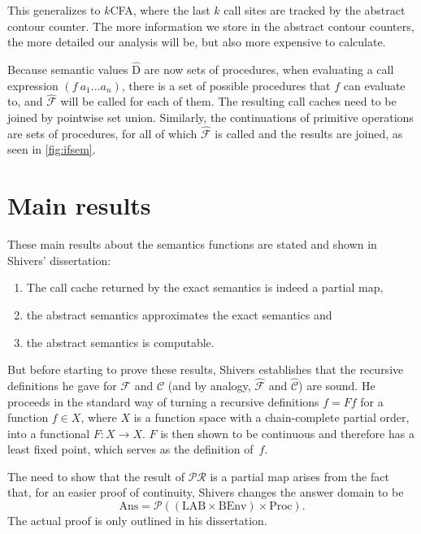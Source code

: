 \documentclass[a4paper,parskip=half,BCOR=8mm,DIV=calc,12pt]{scrbook}
\newcommand{\C}{\mathcal C}
\newcommand{\F}{\mathcal F}
\newcommand{\PR}{\mathcal {PR}}
\newcommand{\aC}{\widehat{\mathcal C}}
\newcommand{\aF}{\widehat{\mathcal F}}
\begin{document}
This generalizes to $k$CFA, where the last $k$ call sites are tracked by the abstract contour counter. The more information we store in the abstract contour counters, the more detailed our analysis will be, but also more expensive to calculate.

Because semantic values $\widehat{\text{D}}$ are now sets of procedures, when evaluating a call expression $(f\ a_1\ldots a_n)$, there is a set of possible procedures that $f$ can evaluate to, and $\aF$ will be called for each of them. The resulting call caches need to be joined by pointwise set union. Similarly, the continuations of primitive operations are sets of procedures, for all of which $\aF$ is called and the results are  joined, as seen in \cref{fig:ifsem}.

\section{Main results}

These main results about the semantics functions are stated and shown in Shivers’ dissertation:
\begin{enumerate}
\item The call cache returned by the exact semantics is indeed a partial map,
\item the abstract semantics approximates the exact semantics and
\item the abstract semantics is computable.
\end{enumerate}

But before starting to prove these results, Shivers establishes that the recursive definitions he gave for $\F$ and $\C$ (and by analogy, $\aF$ and $\aC$) are sound. He proceeds in the standard way of turning a recursive definitions $f = F f$ for a function $f\in X$, where $X$ is a function space with a chain-complete partial order, into a functional $F\colon X \to X$. $F$ is then shown to be continuous and therefore has a least fixed point, which serves as the definition of~$f$.
  

The need to show that the result of $\PR$ is a partial map arises from the fact that, for an easier proof of continuity, Shivers changes the answer domain to be
\[
\text{Ans} = \mathcal P( (\text{LAB}\times\text{BEnv}) \times \text{Proc}).
\]
The actual proof is only outlined in his dissertation.
\end{document}
